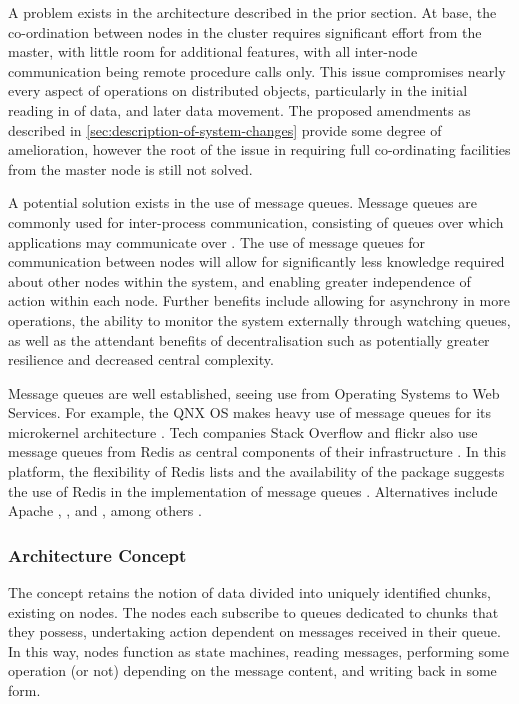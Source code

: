 A problem exists in the architecture described in the prior section.
At base, the co-ordination between nodes in the cluster requires significant effort from the master, with little room for additional features, with all inter-node communication being remote procedure calls only.
This issue compromises nearly every aspect of operations on distributed objects, particularly in the initial reading in of data, and later data movement.
The proposed amendments as described in \cref{sec:description-of-system-changes} provide some degree of amelioration, however the root of the issue in requiring full co-ordinating facilities from the master node is still not solved.

A potential solution exists in the use of message queues.
Message queues are commonly used for inter-process communication, consisting of queues over which applications may communicate over \cite{curry2004message}.
The use of message queues for communication between nodes will allow for significantly less knowledge required about other nodes within the system, and enabling greater independence of action within each node.
Further benefits include allowing for asynchrony in more operations, the ability to monitor the system externally through watching queues, as well as the attendant benefits of decentralisation such as potentially greater resilience and decreased central complexity.

Message queues are well established, seeing use from Operating Systems to Web Services.
For example, the QNX OS makes heavy use of message queues for its microkernel architecture \cite{hildebrand1992qnx}.
Tech companies Stack Overflow and flickr also use message queues from Redis as central components of their infrastructure \cites{nolan2011flickr,montrose2016stack}.
In this platform, the flexibility of Redis lists and the availability of the  package suggests the use of Redis in the implementation of message queues \cite{sanfilippo2009redis,urbanek2020rediscc}.
Alternatives include Apache , , and , among others \cites{snyder2011activemq,garg2013kafka,sanfilippo2016disque}.

\subsubsection{Architecture Concept}\label{architecture-concept}

The concept retains the notion of data divided into uniquely identified chunks, existing on nodes.
The nodes each subscribe to queues dedicated to chunks that they possess, undertaking action dependent on messages received in their queue.
In this way, nodes function as state machines, reading messages, performing some operation (or not) depending on the message content, and writing back in some form.

